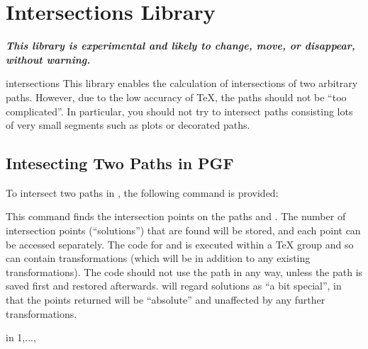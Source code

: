 %
%
%


\section{Intersections Library}

{\bf\emph{This library is experimental and likely to change,
move, or disappear, without warning.}}

\begin{pgflibrary}{intersections}
  This library enables the calculation of intersections of
  two arbitrary paths. However, due to the low accuracy of
  \TeX, the paths should not be ``too complicated''.
  In particular, you should not try to intersect paths consisting 
  lots of very small segments such as plots or decorated paths.
\end{pgflibrary}

\subsection{Intesecting Two Paths in PGF}
  
  To intersect two paths in \pgfname, the following command is
  provided:
   
\begin{command}{\pgfintersectionofpaths{}}
  This command finds the intersection points on the paths 
   and . The number of intersection points
  (``solutions'') that are found will be stored, and each point 
  can be accessed separately. The code for  and 
   is executed within a \TeX{} group and so can contain
  transformations (which will be in addition to any existing
  transformations). The code should not use the path in any way, 
  unless the path is saved first and restored afterwards.
  \pgfname{} will regard solutions as ``a bit
  special'', in that the points returned  will be ``absolute'' and 
  unaffected by any further transformations.

\begin{codeexample}[]
\begin{pgfpicture}
\pgfintersectionofpaths
{
  \pgfgetpath\temppath
  \pgfsetpath\temppath
}
{
  \pgfgetpath\temppath
  \pgfsetpath\temppath
}
\foreach \s in {1,...,\pgfintersectionsolutions}
  {\pgfpathcircle{\pgfpointintersectionsolution{\s}}{2pt}}
\end{pgfpicture}
\end{codeexample}

\end{command}

